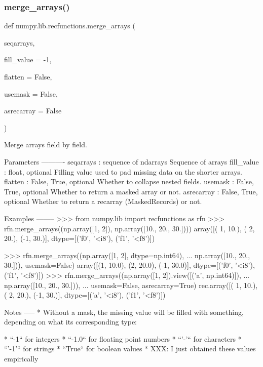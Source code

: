 \subsubsection{\texorpdfstring{merge\+\_\+arrays()}{merge\_arrays()}}
{\footnotesize\ttfamily def numpy.\+lib.\+recfunctions.\+merge\+\_\+arrays (\begin{DoxyParamCaption}\item[{}]{seqarrays,  }\item[{}]{fill\+\_\+value = {\ttfamily -\/1},  }\item[{}]{flatten = {\ttfamily False},  }\item[{}]{usemask = {\ttfamily False},  }\item[{}]{asrecarray = {\ttfamily False} }\end{DoxyParamCaption})}

\begin{DoxyVerb}Merge arrays field by field.

Parameters
----------
seqarrays : sequence of ndarrays
    Sequence of arrays
fill_value : {float}, optional
    Filling value used to pad missing data on the shorter arrays.
flatten : {False, True}, optional
    Whether to collapse nested fields.
usemask : {False, True}, optional
    Whether to return a masked array or not.
asrecarray : {False, True}, optional
    Whether to return a recarray (MaskedRecords) or not.

Examples
--------
>>> from numpy.lib import recfunctions as rfn
>>> rfn.merge_arrays((np.array([1, 2]), np.array([10., 20., 30.])))
array([( 1, 10.), ( 2, 20.), (-1, 30.)],
      dtype=[('f0', '<i8'), ('f1', '<f8')])

>>> rfn.merge_arrays((np.array([1, 2], dtype=np.int64),
...         np.array([10., 20., 30.])), usemask=False)
 array([(1, 10.0), (2, 20.0), (-1, 30.0)],
         dtype=[('f0', '<i8'), ('f1', '<f8')])
>>> rfn.merge_arrays((np.array([1, 2]).view([('a', np.int64)]),
...               np.array([10., 20., 30.])),
...              usemask=False, asrecarray=True)
rec.array([( 1, 10.), ( 2, 20.), (-1, 30.)],
          dtype=[('a', '<i8'), ('f1', '<f8')])

Notes
-----
* Without a mask, the missing value will be filled with something,
  depending on what its corresponding type:

  * ``-1``      for integers
  * ``-1.0``    for floating point numbers
  * ``'-'``     for characters
  * ``'-1'``    for strings
  * ``True``    for boolean values
* XXX: I just obtained these values empirically
\end{DoxyVerb}
 \mbox{\label{namespacenumpy_1_1lib_1_1recfunctions_abd5e0ba26439a27ef66bbe78021f52a1}} 
